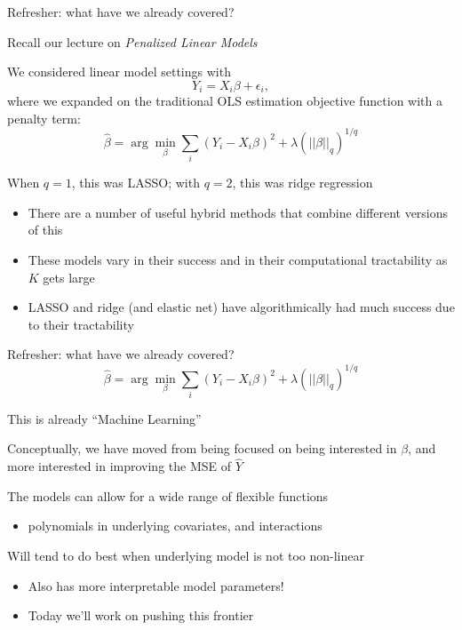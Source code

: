 \documentclass[notes,11pt, aspectratio=169]{beamer}
\newenvironment{wideitemize}{\itemize\addtolength{\itemsep}{10pt}}{\enditemize}
\begin{document}
\begin{frame}{Refresher: what have we already covered?}
  \begin{wideitemize}
  \item Recall our lecture on \emph{Penalized Linear Models}
  \item We considered linear model settings with
    $$ Y_{i} = X_{i}\beta + \epsilon_{i},$$
    where we expanded on the traditional OLS estimation objective function with a penalty term:
    $$\hat{\beta} = \arg\min_{\beta} \sum_{i}(Y_{i} - X_{i}\beta)^{2} + \lambda  (||\beta||_{q})^{1/q}$$
  \item When $q = 1$, this was LASSO; with $q=2$, this was ridge regression
    \begin{itemize}
    \item There are a number of useful hybrid methods that combine different versions of this
    \item These models vary in their success and in their computational tractability as $K$ gets large
    \item LASSO and ridge (and elastic net) have algorithmically had much success due to their tractability
    \end{itemize}
  \end{wideitemize}
\end{frame}

\begin{frame}{Refresher: what have we already covered?}
    $$\hat{\beta} = \arg\min_{\beta} \sum_{i}(Y_{i} - X_{i}\beta)^{2} + \lambda  (||\beta||_{q})^{1/q}$$  
    \begin{wideitemize}
    \item This is already ``Machine Learning''
    \item Conceptually, we have moved from being focused on being
      interested in $\beta$, and more interested in improving the MSE
      of $\hat{Y}$
    \item The models can allow for a wide range of flexible functions
      \begin{itemize}
      \item polynomials in underlying covariates, and interactions
      \end{itemize}
    \item Will tend to do best when underlying model is not too non-linear
      \begin{itemize}
      \item Also has more interpretable model parameters!
      \item Today we'll work on pushing this frontier
      \end{itemize}
  \end{wideitemize}
\end{frame}
\end{document}
